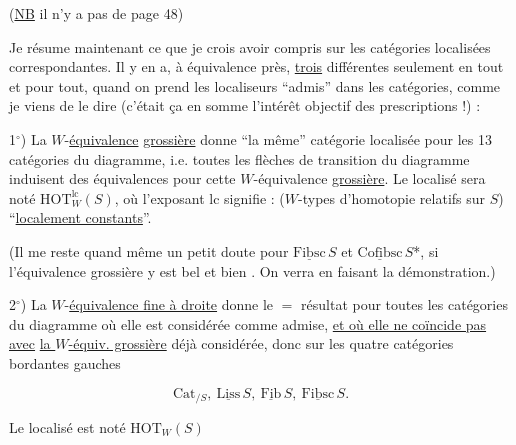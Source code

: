  (\uline{NB} il n'y a pas de page 48)

Je résume maintenant ce que je crois avoir compris sur les catégories localisées correspondantes. Il y en a, à équivalence près, \uline{trois} différentes seulement en tout et pour tout, quand on prend les localiseurs ``admis'' dans les catégories, comme je viens de le dire (c'était ça en somme l'intérêt objectif des prescriptions !) :   

1$^\circ$) La $W$-\uline{équivalence} \uline{grossière} donne ``la même'' catégorie localisée pour les 13 catégories du diagramme, i.e. toutes les flèches de transition du diagramme induisent des équivalences pour cette $W$-équivalence \uline{grossière}. Le localisé  sera noté $\boxed{\mathrm{HOT}^{\mathrm{lc}}_W(S)}$, où l'exposant lc signifie : ($W$-types d'homotopie relatifs sur $S$) ``\uline{localement constants}''.

(Il me reste quand même un petit doute pour $\underline{\mathrm{Fibsc}}\,S$ et $\underline{\mathrm{Cofibsc}}\,S$*, si l'équivalence grossière y est bel et bien . On verra en faisant la démonstration.)


2$^\circ$) La $W$-\uline{équivalence fine à droite} donne le $=$ résultat pour toutes les catégories du diagramme où elle est considérée comme admise,  \uline{et où elle ne coïncide pas} \uline{avec} \uline{la $W$-équiv. grossière} déjà considérée, donc sur les quatre catégories bordantes gauches

\[
 \mathrm{Cat}_{/S},\ \underline{\mathrm{Liss}}\,S,\ \underline{\mathrm{Fib}}\,S,\ \underline{\mathrm{Fibsc}}\,S.
\]


Le localisé est noté $\boxed{\mathrm{HOT}_W(S)}$

